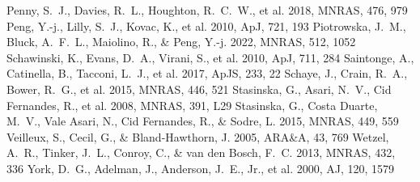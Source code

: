 \documentclass[twocolumn]{aastex631}
\begin{document}
\begin{thebibliography}{}
 Penny, S.~J., Davies, R.~L., Houghton, R.~C.~W., et al. 2018, MNRAS, 476, 979
 Peng, Y.-j., Lilly, S.~J., Kovac, K., et al. 2010, ApJ, 721, 193
 Piotrowska, J.~M., Bluck, A.~F.~L., Maiolino, R., \& Peng, Y.-j. 2022, MNRAS, 512, 1052
 Schawinski, K., Evans, D.~A., Virani, S., et al. 2010, ApJ, 711, 284
 Saintonge, A., Catinella, B., Tacconi, L.~J., et al. 2017, ApJS, 233, 22
 Schaye, J., Crain, R.~A., Bower, R.~G., et al. 2015, MNRAS, 446, 521
 Stasinska, G., Asari, N.~V., Cid Fernandes, R., et al. 2008, MNRAS, 391, L29
 Stasinska, G., Costa Duarte, M.~V., Vale Asari, N., Cid Fernandes, R., \& Sodre, L. 2015, MNRAS, 449, 559
 Veilleux, S., Cecil, G., \& Bland-Hawthorn, J. 2005, ARA\&A, 43, 769
 Wetzel, A.~R., Tinker, J.~L., Conroy, C., \& van den Bosch, F.~C. 2013, MNRAS, 432, 336
 York, D.~G., Adelman, J., Anderson, J.~E., Jr., et al. 2000, AJ, 120, 1579
\end{thebibliography}
\end{document}
